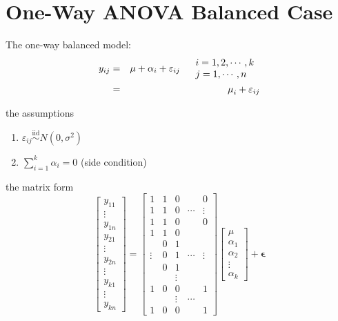 \documentclass{article}
\begin{document}
\section{One-Way ANOVA Balanced Case}

The one-way balanced model:%
\begin{eqnarray*}
y_{ij} &=&\mu +\alpha _{i}+\varepsilon _{ij}\quad 
\begin{tabular}{l}
$i=1,2,\cdots ,k$ \\ 
$j=1,\cdots ,n$%
\end{tabular}
\\
&=&\mu _{i}+\varepsilon _{ij}
\end{eqnarray*}

the assumptions

\begin{enumerate}
\item $\varepsilon _{ij}\overset{\text{iid}}{\sim }N\left( 0,\sigma
^{2}\right) $

\item $\sum\limits_{i=1}^{k}\alpha _{i}=0$ (side condition)
\end{enumerate}

\bigskip

the matrix form%
\begin{equation*}
\left[ 
\begin{array}{c}
y_{11} \\ 
\vdots  \\ 
y_{1n} \\ 
y_{21} \\ 
\vdots  \\ 
y_{2n} \\ 
\vdots  \\ 
y_{k1} \\ 
\vdots  \\ 
y_{kn}%
\end{array}%
\right] =\left[ 
\begin{array}{ccccc}
1 & 1 & 0 &  & 0 \\ 
1 & 1 & 0 & \cdots  & \vdots  \\ 
1 & 1 & 0 &  & 0 \\ 
1 & 1 & 0 &  &  \\ 
& 0 & 1 &  &  \\ 
\vdots  & 0 & 1 & \cdots  & \vdots  \\ 
& 0 & 1 &  &  \\ 
&  & \vdots  &  &  \\ 
1 & 0 & 0 &  & 1 \\ 
&  & \vdots  & \cdots  &  \\ 
1 & 0 & 0 &  & 1%
\end{array}%
\right] \left[ 
\begin{array}{c}
\mu  \\ 
\alpha _{1} \\ 
\alpha _{2} \\ 
\vdots  \\ 
\alpha _{k}%
\end{array}%
\right] +\mathbf{\epsilon }
\end{equation*}
\end{document}
